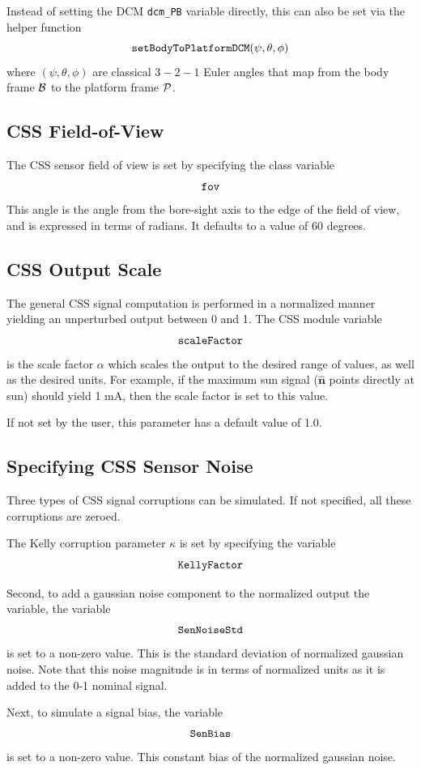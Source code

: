 Instead of setting the DCM {\tt dcm\_PB} variable directly, this can also be set via the helper function
$$
	{\tt setBodyToPlatformDCM}(\psi, \theta, \phi)
$$
where $(\psi, \theta, \phi)$ are classical $3-2-1$ Euler angles that map from the body frame $\cal B$ to the platform frame $\cal P$.




\subsection{CSS Field-of-View}
The CSS sensor field of view is set by specifying the class variable
$$
	{\tt fov}
$$
This angle is the angle from the bore-sight axis to the edge of the field of view, and is expressed in terms of radians.
It defaults to a value of 60 degrees.





\subsection{CSS Output Scale}
The general CSS signal computation is performed in a normalized manner yielding an unperturbed output between 0 and 1.  The CSS module variable
$$
	{\tt scaleFactor}
$$
is the scale factor $\alpha$ which scales the output to the desired range of values, as well as the desired units.  For example, if the maximum sun signal ($\hat{\bm n}$ points directly at sun) should yield 1 mA, then the scale factor is set to this value.

If not set by the user, this parameter has a default value of 1.0.



\subsection{Specifying CSS Sensor Noise}
Three types of CSS signal corruptions can be simulated.  If not specified, all these corruptions are zeroed.

The Kelly corruption parameter $\kappa$ is set by specifying the variable
$$
	{\tt KellyFactor}
$$

Second, to add a gaussian noise component to the normalized output the variable, the variable
$$
	{\tt SenNoiseStd}
$$
is set to a non-zero value.  This is the standard deviation of normalized gaussian noise.  Note that this noise magnitude is in terms of normalized units as it is added to the 0-1 nominal signal.

Next, to simulate a signal bias, the variable
$$
	{\tt SenBias}
$$
is set to a non-zero value.   This constant bias of the normalized gaussian noise.

